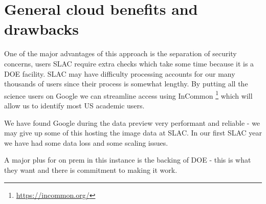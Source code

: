 \section{General cloud benefits and drawbacks} \label{sec:tradeoffs}

One of the major advantages of this approach is the separation of security concerns, users  SLAC require extra checks which take some time because it is a DOE facility.
SLAC may have difficulty processing accounts  for  our many thousands of users since their process is somewhat lengthy.
By putting all the science users on Google we can streamline access using InCommon \footnote{\url{https://incommon.org/}} which will allow us to identify most US academic users.

We have found Google during the data preview very performant and reliable - we may give up some of this hosting the image data at SLAC.
In our first SLAC year we have had some data loss and some scaling issues.

A major plus for on prem in this instance is the backing of DOE - this is what they want and there is commitment to making it work.

